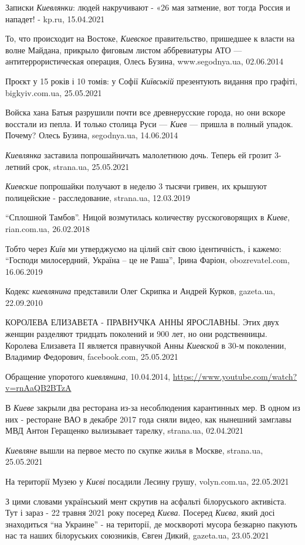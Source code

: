Записки \emph{Киевлянки}: людей накручивают - «26 мая затмение, вот тогда
Россия и нападет! - kp.ru, 15.04.2021

То, что происходит на Востоке, \emph{Киевское} правительство, пришедшее к
власти на волне Майдана, прикрыло фиговым листом аббревиатуры АТО —
антитеррористическая операция, Олесь Бузина, www.segodnya.ua, 02.06.2014

Проєкт у 15 років і 10 томів: у Софії \emph{Київській} презентують видання про
графіті, bigkyiv.com.ua, 25.05.2021

Войска хана Батыя разрушили почти все древнерусские города, но они вскоре
восстали из пепла. И только столица Руси — \emph{Киев} — пришла в полный
упадок.  Почему? Олесь Бузина, segodnya.ua, 14.06.2014

\emph{Киевлянка} заставила попрошайничать малолетнюю дочь. Теперь ей грозит
3-летний срок, strana.ua, 25.05.2021

\emph{Киевские} попрошайки получают в неделю 3 тысячи гривен, их крышуют
полицейские - расследование, strana.ua, 12.03.2019

\enquote{Сплошной Тамбов}. Ницой возмутилась количеству русскоговорящих в
\emph{Киеве}, rian.com.ua, 26.02.2018

Тобто через \emph{Київ} ми утверджуємо на цілий світ свою ідентичність, і
кажемо: \enquote{Господи милосердний, Україна – це не Раша}, Ірина Фаріон,
obozrevatel.com, 16.06.2019

Кодекс \emph{киевлянина} представили Олег Скрипка и Андрей Курков, gazeta.ua,
22.09.2010

КОРОЛЕВА ЕЛИЗАВЕТА - ПРАВНУЧКА АННЫ ЯРОСЛАВНЫ.  Этих двух женщин разделяют
тридцать поколений и 900 лет, но они родственницы.  Королева Елизавета II
является правнучкой Анны \emph{Киевской} в 30-м поколении, Владимир Федорович,
facebook.com, 25.05.2021

Обращение упоротого \emph{киевлянина}, 10.04.2014, \url{https://www.youtube.com/watch?v=rnAaQB2BTzA}

В \emph{Киеве} закрыли два ресторана из-за несоблюдения карантинных мер. В одном из
них - ресторане ВАО в декабре 2017 года сняли видео, как нынешний замглавы МВД
Антон Геращенко вылизывает тарелку, strana.ua, 02.04.2021

\emph{Киевляне} вышли на первое место по скупке жилья в Москве, strana.ua, 25.05.2021

На території Музею у \emph{Києві} посадили Лесину грушу, volyn.com.ua, 22.05.2021

З цими словами український мент скрутив на асфальті білоруського активіста.
Тут і зараз - 22 травня 2021 року посеред \emph{Києва}. Посеред \emph{Києва}, який досі
знаходиться \enquote{на Украине} - на території, де москвороті мусора безкарно пакують
нас та наших білоруських союзників, Євген Дикий, gazeta.ua, 23.05.2021

